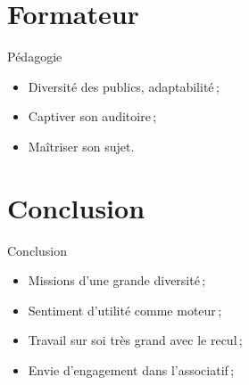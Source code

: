 \documentclass[
  11pt,
  aspectratio=169
]{beamer}
\begin{document}
\section{Formateur}

\begin{frame}{Pédagogie}
  \begin{itemize}
    \item Diversité des publics, adaptabilité ;
    \item Captiver son auditoire ;
    \item Maîtriser son sujet.
  \end{itemize}
\end{frame}

\begin{frame}{}
  
\end{frame}

\section{Conclusion}

\begin{frame}{Conclusion}
    \begin{itemize}
      \item Missions d’une grande diversité ;
      \item Sentiment d’utilité comme moteur ;
      \item Travail sur soi très grand avec le recul ;
      \item Envie d’engagement dans l’associatif ;
    \end{itemize}
\end{frame}
\end{document}
